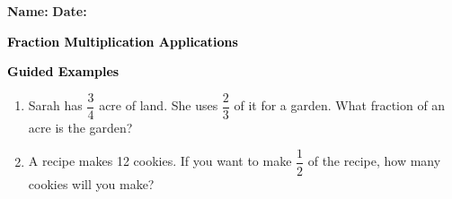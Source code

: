 \documentclass[12pt, letterpaper, fleqn]{article}
\begin{document}
\textbf{Name:} \underline{\hspace{5cm}}
\hfill
\textbf{Date:} \underline{\hspace{3cm}}\\

\begin{tcolorbox}[colback=customteal!20]
    \large\textcolor{black}{\textbf{Fraction Multiplication Applications}}
\end{tcolorbox}
\newpage
\begin{tcolorbox}[colback=customteal!20]
    \large\textcolor{black}{\textbf{Guided Examples}}
\end{tcolorbox}
\begin{enumerate}[itemsep=3.5cm, leftmargin=0.6cm]
\item Sarah has $\dfrac{3}{4}$ acre of land. She uses $\dfrac{2}{3}$ of it for a garden. What fraction of an acre is the garden?
\vspace{3cm}
\item A recipe makes 12 cookies. If you want to make $\dfrac{1}{2}$ of the recipe, how many cookies will you make?
\end{enumerate}
\end{document}
